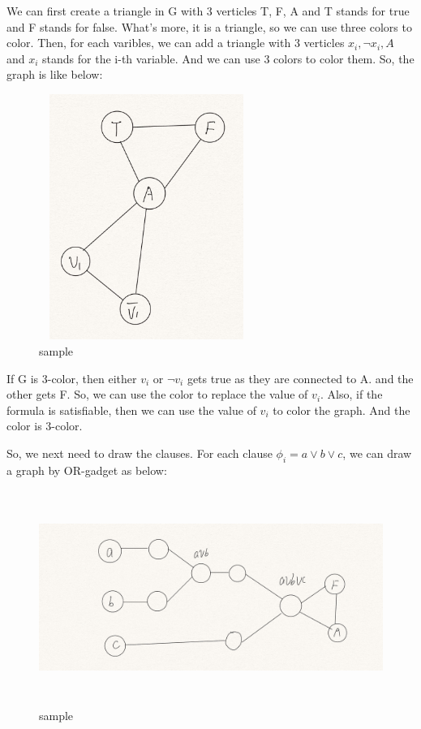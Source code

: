 \documentclass[UTF8]{ctexart}
\renewcommand{\(}{\left(}
\renewcommand{\)}{\right)}
\begin{document}
We can first create a triangle in G with 3 verticles {T, F, A} and T stands for true and F stands for false.
What's more, it is a triangle, so we can use three colors to color. Then, for each varibles, we can add a triangle with 3 verticles ${x_{i}, \neg x_{i}, A}$ and $x_{i}$ stands for the i-th variable. And we can use 3 colors to color them. 
So, the graph is like below:
\begin{figure}[H]
    \centering
    \includegraphics[width=7cm,height=8cm]{1.jpg}
    \caption{sample}
    \end{figure} 

If G is 3-color, then either $v_{i}$ or $\neg v_{i}$ gets true as they are connected to A.
and the other gets F. So, we can use the color to replace the value of $v_{i}$. Also, if the formula is satisfiable, then we can use the value of $v_{i}$ to color the graph.
And the color is 3-color.

So, we next need to draw the clauses. For each clause $\phi_{i} = a \vee b \vee c$, we can draw a graph by OR-gadget as below:
\begin{figure}[H]
    \centering
    \includegraphics[width=12cm,height=7cm]{2.jpg}
    \caption{sample}
    \end{figure} 
\end{document}
